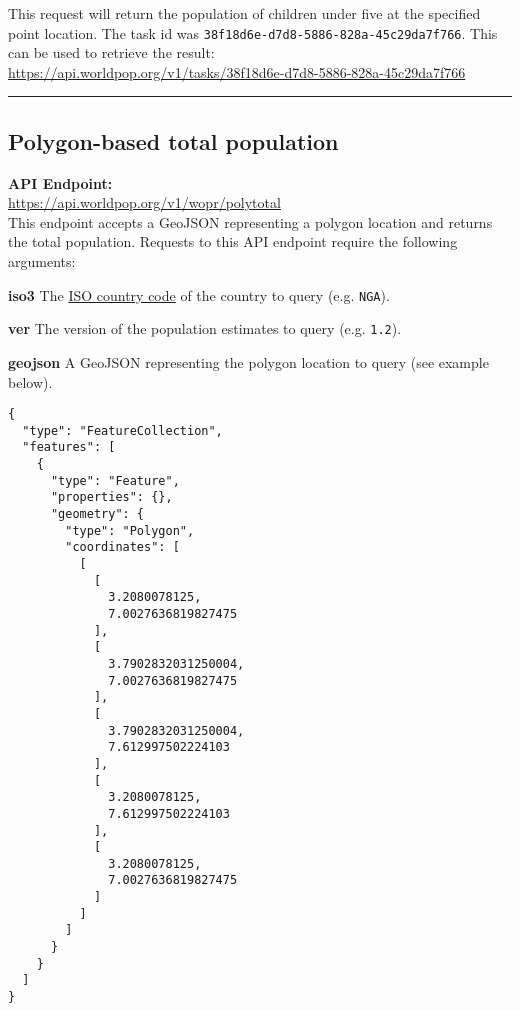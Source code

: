 \documentclass[]{article}
\begin{document}
This request will return the population of children under five at the
specified point location. The task id was
\texttt{38f18d6e-d7d8-5886-828a-45c29da7f766}. This can be used to
retrieve the result:\\
\url{https://api.worldpop.org/v1/tasks/38f18d6e-d7d8-5886-828a-45c29da7f766}\\

\begin{center}\rule{0.5\linewidth}{0.5pt}\end{center}

\subsection{Polygon-based total
population}\label{polygon-based-total-population}

\textbf{API Endpoint:}\\
\url{https://api.worldpop.org/v1/wopr/polytotal}\\

This endpoint accepts a GeoJSON representing a polygon location and
returns the total population. Requests to this API endpoint require the
following arguments:

\textbf{iso3} The
\href{https://en.wikipedia.org/wiki/ISO_3166-1_alpha-3}{ISO country
code} of the country to query (e.g. \texttt{NGA}).

\textbf{ver} The version of the population estimates to query (e.g.
\texttt{1.2}).

\textbf{geojson} A GeoJSON representing the polygon location to query
(see example below).

\begin{verbatim}
{
  "type": "FeatureCollection",
  "features": [
    {
      "type": "Feature",
      "properties": {},
      "geometry": {
        "type": "Polygon",
        "coordinates": [
          [
            [
              3.2080078125,
              7.0027636819827475
            ],
            [
              3.7902832031250004,
              7.0027636819827475
            ],
            [
              3.7902832031250004,
              7.612997502224103
            ],
            [
              3.2080078125,
              7.612997502224103
            ],
            [
              3.2080078125,
              7.0027636819827475
            ]
          ]
        ]
      }
    }
  ]
}
\end{verbatim}
\end{document}
